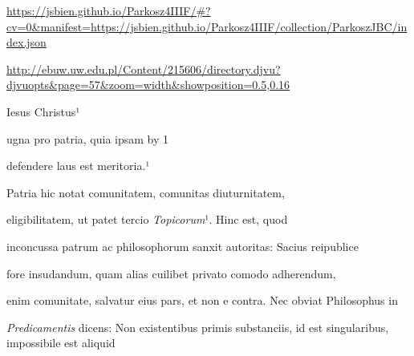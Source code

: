 
\newParkoszpage

{
\url{https://jsbien.github.io/Parkosz4IIIF/\#?cv=0&manifest=https://jsbien.github.io/Parkosz4IIIF/collection/ParkoszJBC/index.json}
  
\url{http://ebuw.uw.edu.pl/Content/215606/directory.djvu?djvuopts&page=57&zoom=width&showposition=0.5,0.16}
}


\fulllines
  
  Iesus Christus¹

  ugna pro patria, quia ipsam
  \advance\plineno by 1


defendere laus est meritoria.¹
%




  
Patria hic notat comunitatem, comunitas diuturnitatem, 

 eligibilitatem, ut patet tercio \textit{Topicorum}¹. Hinc est, quod

inconcussa patrum ac philosophorum sanxit autoritas: Sacius reipublice

fore insudandum, quam alias cuilibet privato comodo adherendum, 

 enim comunitate, salvatur eius pars, et non e contra. Nec obviat Philosophus in

\textit{Predicamentis} dicens: Non existentibus primis substanciis, id est singularibus, impossibile est aliquid

